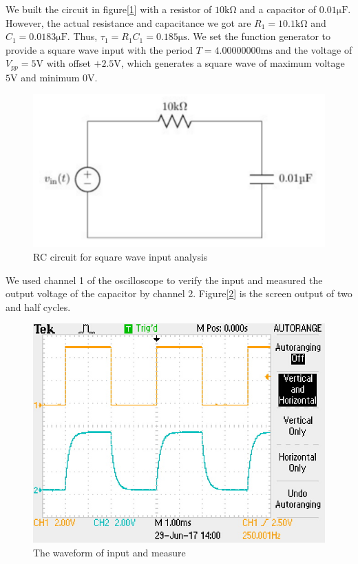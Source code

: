 \hfill \newline
\phantom{ } We built the circuit in figure[\ref{fig:cir}] with a resistor of $10\mathrm{k\Omega}$ and a capacitor of
$0.01\mathrm{\mu F}$. However, the actual resistance and capacitance we got are $R_1=10.1\mathrm{k\Omega}$ and $C_1=0.0183\mathrm{\mu F}$. Thus, $\tau_1 = R_1C_1 = 0.185\mathrm{\mu s}$. \newline
\phantom{ } We set the function generator to provide a square wave input with the period $T=4.00000000\mathrm{ms}$ and the voltage of $V_{pp}=5\mathrm{V}$ with offset $+2.5\mathrm{V}$, which generates a square wave of maximum voltage $5\mathrm{V}$ and minimum $0\mathrm{V}$.

\begin{figure}[!htbp]
	\centering
	\begin{framed}
	\includegraphics[width=\linewidth]{images/1_1.PNG}
	\caption{RC circuit for square wave input analysis}
		\end{framed}
	\label{fig:cir}
\end{figure}

We used channel 1 of the oscilloscope to verify the input and measured the output voltage of the capacitor by channel 2. Figure[\ref{fig:osc1}] is the screen output of two and half cycles.

\begin{figure}[!htbp]
	\centering
	\begin{framed}
	\includegraphics[width=0.95\linewidth]{images/1_2.JPG}
	\caption{The waveform of input and measure}
		\end{framed}
	\label{fig:osc1}
\end{figure}

